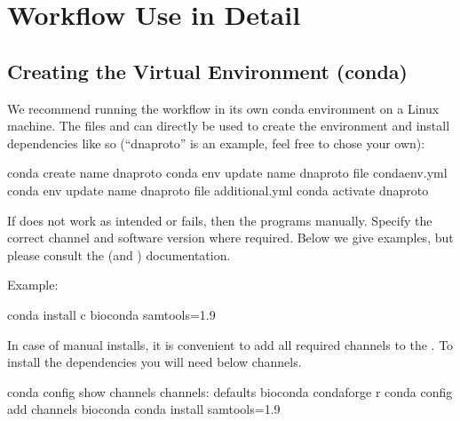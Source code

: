 \documentclass[letterpaper,10pt,english]{sphinxmanual}
\begin{document}
\chapter{Workflow Use in Detail}
\label{\detokenize{index:workflow-use-in-detail}}

\section{Creating the Virtual Environment (conda)}
\label{\detokenize{index:creating-the-virtual-environment-conda}}
We recommend running the workflow in its own conda environment on a Linux machine. The files  and  can directly be used to create the environment and install dependencies like so (“dna\sphinxhyphen{}proto” is an example, feel free to chose your own):

\begin{sphinxVerbatim}[commandchars=\\\{\}]
\PYGZdl{} conda create \PYGZhy{}\PYGZhy{}name dna\PYGZhy{}proto
\PYGZdl{} conda env update \PYGZhy{}\PYGZhy{}name dna\PYGZhy{}proto \PYGZhy{}\PYGZhy{}file condaenv.yml
\PYGZdl{} conda env update \PYGZhy{}\PYGZhy{}name dna\PYGZhy{}proto \PYGZhy{}\PYGZhy{}file additional.yml
\PYGZdl{} conda activate dna\PYGZhy{}proto
\end{sphinxVerbatim}

If  does not work as intended or fails, then  the programs manually. Specify the correct channel and software version where required. Below we give examples, but please consult the  (and ) documentation.

Example:

\begin{sphinxVerbatim}[commandchars=\\\{\}]
\PYGZdl{} conda install \PYGZhy{}c bioconda samtools=1.9
\end{sphinxVerbatim}

In case of manual installs, it is convenient to add all required channels to the . To install the dependencies you will need below channels.

\begin{sphinxVerbatim}[commandchars=\\\{\}]
\PYGZdl{} conda config \PYGZhy{}\PYGZhy{}show channels
channels:
      \PYGZhy{} defaults
      \PYGZhy{} bioconda
      \PYGZhy{} conda\PYGZhy{}forge
      \PYGZhy{} r
\PYGZdl{} conda config \PYGZhy{}\PYGZhy{}add channels bioconda
\PYGZdl{} conda install samtools=1.9
\end{sphinxVerbatim}
\end{document}

